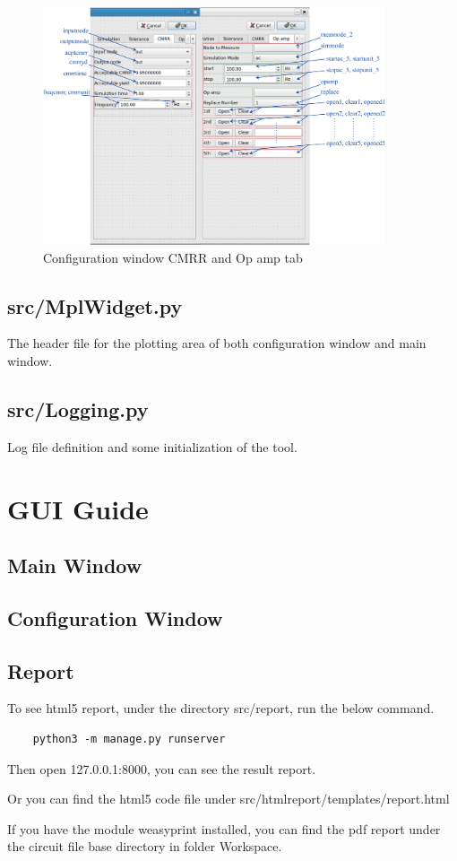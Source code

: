 \documentclass[12pt,a4paper]{article}
\begin{document}
\begin{itemize}[leftmargin=*]
\begin{figure}[ht]
    \centering
    \includegraphics[width=0.9\textwidth]{Image/config34.eps}
    \caption{Configuration window CMRR and Op amp tab}
\end{figure}

\subsection{src/MplWidget.py}
The header file for the plotting area of both configuration window and main window.

\subsection{src/Logging.py}
Log file definition and some initialization of the tool.

\end{itemize}


\section{GUI Guide}
\subsection{Main Window}

\subsection{Configuration Window}

\subsection{Report}
To see html5 report, under the directory src/report, run the below command.
\begin{lstlisting}
    python3 -m manage.py runserver
\end{lstlisting}

Then open 127.0.0.1:8000, you can see the result report.

Or you can find the html5 code file under src/htmlreport/templates/report.html

If you have the module weasyprint installed, you can find the pdf report under the circuit file base directory in folder Workspace.



%
\end{document}
